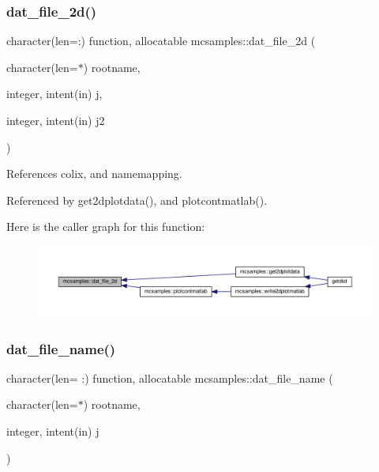 \subsubsection{\texorpdfstring{dat\+\_\+file\+\_\+2d()}{dat\_file\_2d()}}
{\footnotesize\ttfamily character(len=\+:) function, allocatable mcsamples\+::dat\+\_\+file\+\_\+2d (\begin{DoxyParamCaption}\item[{character(len=$\ast$)}]{rootname,  }\item[{integer, intent(in)}]{j,  }\item[{integer, intent(in)}]{j2 }\end{DoxyParamCaption})}



References colix, and namemapping.



Referenced by get2dplotdata(), and plotcontmatlab().

Here is the caller graph for this function\+:
\nopagebreak
\begin{figure}[H]
\begin{center}
\leavevmode
\includegraphics[width=350pt]{namespacemcsamples_ab816e54fd85d1f1c125d828e843a2343_icgraph}
\end{center}
\end{figure}
\mbox{\label{namespacemcsamples_a8613f88e39f47c058447963d5b9f53dc}} 
\subsubsection{\texorpdfstring{dat\+\_\+file\+\_\+name()}{dat\_file\_name()}}
{\footnotesize\ttfamily character(len= \+:) function, allocatable mcsamples\+::dat\+\_\+file\+\_\+name (\begin{DoxyParamCaption}\item[{character(len=$\ast$)}]{rootname,  }\item[{integer, intent(in)}]{j }\end{DoxyParamCaption})}



